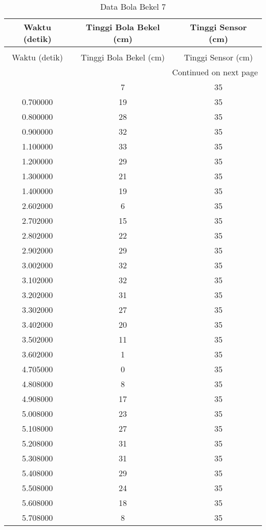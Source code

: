 \begin{longtable}[htbp]{|c|c|c|}
\caption{Data Bola Bekel 7} \\
\hline
Waktu (detik) & Tinggi Bola Bekel (cm) & Tinggi Sensor (cm) \\ \hline
\endfirsthead
\caption[]{Data Bola Bekel 7} \\
\hline
Waktu (detik) & Tinggi Bola Bekel (cm) & Tinggi Sensor (cm) \\ \hline
\endhead
\multicolumn{3}{r}{Continued on next page} \\
\endfoot
\endlastfoot
0.600000 & 7 & 35 \\ \hline
0.700000 & 19 & 35 \\ \hline
0.800000 & 28 & 35 \\ \hline
0.900000 & 32 & 35 \\ \hline
1.100000 & 33 & 35 \\ \hline
1.200000 & 29 & 35 \\ \hline
1.300000 & 21 & 35 \\ \hline
1.400000 & 19 & 35 \\ \hline
2.602000 & 6 & 35 \\ \hline
2.702000 & 15 & 35 \\ \hline
2.802000 & 22 & 35 \\ \hline
2.902000 & 29 & 35 \\ \hline
3.002000 & 32 & 35 \\ \hline
3.102000 & 32 & 35 \\ \hline
3.202000 & 31 & 35 \\ \hline
3.302000 & 27 & 35 \\ \hline
3.402000 & 20 & 35 \\ \hline
3.502000 & 11 & 35 \\ \hline
3.602000 & 1 & 35 \\ \hline
4.705000 & 0 & 35 \\ \hline
4.808000 & 8 & 35 \\ \hline
4.908000 & 17 & 35 \\ \hline
5.008000 & 23 & 35 \\ \hline
5.108000 & 27 & 35 \\ \hline
5.208000 & 31 & 35 \\ \hline
5.308000 & 31 & 35 \\ \hline
5.408000 & 29 & 35 \\ \hline
5.508000 & 24 & 35 \\ \hline
5.608000 & 18 & 35 \\ \hline
5.708000 & 8 & 35 \\ \hline

\end{longtable}

